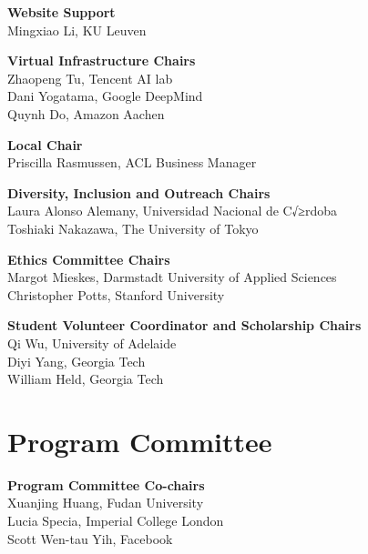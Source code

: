 {\bf Website Support} \\
Mingxiao Li, KU Leuven

{\bf Virtual Infrastructure Chairs} \\
Zhaopeng Tu, Tencent AI lab\\
Dani Yogatama, Google DeepMind \\
Quynh Do, Amazon Aachen

{\bf Local Chair} \\
Priscilla Rasmussen, ACL Business Manager

{\bf Diversity, Inclusion and Outreach Chairs} \\
Laura Alonso Alemany, Universidad Nacional de C√≥rdoba \\
Toshiaki Nakazawa, The University of Tokyo

{\bf Ethics Committee Chairs} \\
Margot Mieskes, Darmstadt University of Applied Sciences \\
Christopher Potts, Stanford University

{\bf Student Volunteer Coordinator and Scholarship Chairs} \\
Qi Wu, University of Adelaide \\
Diyi Yang, Georgia Tech\\
William Held, Georgia Tech



\clearpage
\section{Program Committee}
\setlength{\parindent}{0pt}

\vspace*{0.5cm}

{\bf Program Committee Co-chairs} \\
Xuanjing Huang, Fudan University\\
Lucia Specia, Imperial College London\\
Scott Wen-tau Yih, Facebook

